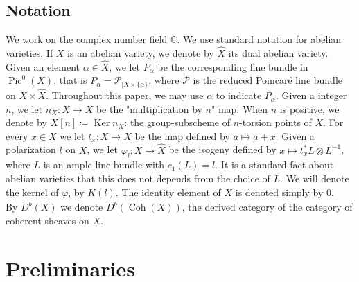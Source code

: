 \documentclass[11pt,letter]{amsart}
\numberwithin{equation}{section}
\begin{document}
\subsection*{Notation}
We work on the complex number field $\mathbb{C}$. We use standard notation for abelian varieties. If $X$ is an abelian variety, we denote by $\hat{X}$ its dual abelian variety. Given an element $\alpha\in\hat{X}$, we let $P_\alpha$ be the corresponding line bundle in $\operatorname{Pic}^0(X)$, that is 
$P_\alpha=\mathscr{P}_{|X\times\{\alpha\}}$, where $\mathscr{P}$ is the reduced Poincar\'e line bundle on $X\times \hat X$. Throughout this paper, we may use $\alpha$ to indicate $P_\alpha$. Given a integer $n$, we let $n_X:X\rightarrow X$ be the "multiplication by $n$" map. When $n$ is positive, we denote by $X[n]\coloneqq \operatorname{Ker}n_X$: the group-subscheme of $n$-torsion points of $X$. For every $x\in X$ we let $t_x:X\rightarrow X$ be the map defined by $a\mapsto a+x$. Given a polarization $l$ on $X$, we let $\varphi_l:X\rightarrow \hat{X}$ be the isogeny defined by $x\mapsto t_x^*L\otimes L^{-1}$, where $L$ is an ample line bundle with $c_1(L)=l$. It is a standard fact about abelian varieties that this does not depends from the choice of $L$. We will denote the  kernel of $\varphi_l$ by $K(l)$. The identity element of $X$ is denoted simply by 0.\\ By $D^b(X)$ we denote $D^b(\operatorname{Coh}(X))$, the derived category of the category of coherent sheaves on $X$.

\section{Preliminaries}\label{sec2}
\end{document}

